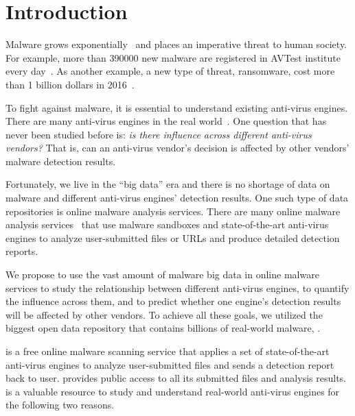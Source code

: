 \vspace{-0.05in}
\section{Introduction}
\label{sec:intro}

Malware grows exponentially~\cite{avtest} and places an imperative threat to human society. 
For example, more than 390000 new malware are registered in AVTest institute every day~\cite{avtest}.
As another example, a new type of threat, ransomware, cost more than 1 billion dollars in 2016~\cite{ransomware}. 

To fight against malware, it is essential to understand existing anti-virus engines.
There are many anti-virus engines in the real world~\cite{virustotal}.
One question that has never been studied before is: 
{\em is there influence across different anti-virus vendors?}
That is, can an anti-virus vendor's decision is affected 
by other vendors' malware detection results. 

Fortunately, we live in the ``big data'' era and there is no shortage of data on malware 
and different anti-virus engines' 
detection results. 
One such type of data repositories is online malware analysis services. 
There are many online malware analysis services~\cite{virustotal,malwr,vxstream,anubis} 
that use malware sandboxes and state-of-the-art
anti-virus engines to analyze user-submitted files 
or URLs and produce detailed detection reports. 

We propose to use the vast amount of malware big data in online malware services 
to study the relationship between different anti-virus engines, 
to quantify the influence across them, 
and to predict whether one engine's detection results will be affected by other vendors. 
To achieve all these goals, we utilized the biggest open data repository
that contains billions of real-world malware, {\em \vt}.

\vt{} is a free online malware scanning service
that applies a set of state-of-the-art anti-virus engines to analyze user-submitted files 
and sends a detection report back to user.
\vt{} provides public access to all its submitted files and analysis results. 
\vt{} is a valuable resource to study and 
understand real-world anti-virus engines for the following two reasons. 

